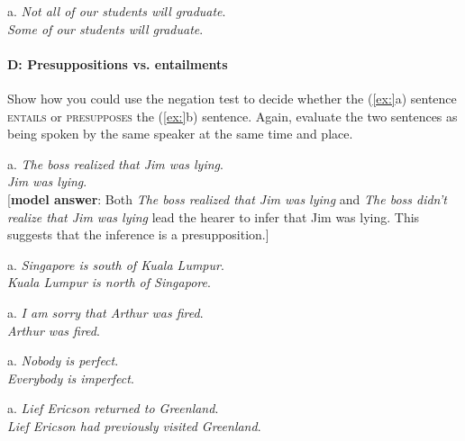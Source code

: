 \begin{stylepoints}
\ea%
    \label{ex:key:4}




          a. \textit{Not all of our students will graduate}.\\
\ex \textit{Some of our students will graduate}.
    \z
\end{stylepoints}

\paragraph*{D: Presuppositions vs. entailments}

Show how you could use the negation test to decide whether the (\ref{ex:}a) sentence \textsc{entails} or \textsc{presupposes} the (\ref{ex:}b) sentence. Again, evaluate the two sentences as being spoken by the same speaker at the same time and place.

\begin{stylepoints}
\ea%
    \label{ex:key:1}




          a. \textit{The boss realized that Jim was lying}.\\
\ex \textit{Jim was lying}.\\
{}[\textbf{model answer}: Both \textit{The boss realized that Jim was lying} and \textit{The boss didn’t realize that Jim was lying} lead the hearer to infer that Jim was lying. This suggests that the inference is a presupposition.]
    \z
\end{stylepoints}

\begin{stylepoints}
\ea%
    \label{ex:key:2}




          a. \textit{Singapore is south of Kuala Lumpur}.\\
\ex \textit{Kuala Lumpur is north of Singapore}.
    \z
\end{stylepoints}

\begin{stylepoints}
\ea%
    \label{ex:key:3}




          a. \textit{I am sorry that Arthur was fired}.\\
\ex \textit{Arthur was fired}.
    \z
\end{stylepoints}

\begin{stylepoints}
\ea%
    \label{ex:key:4}




          a. \textit{Nobody is perfect}.\\
\ex \textit{Everybody is imperfect}.
    \z
\end{stylepoints}

\begin{stylepoints}
\ea%
    \label{ex:key:5}




          a. \textit{Lief Ericson returned to Greenland}.\\
\ex \textit{Lief Ericson had previously visited Greenland}.
    \z
\end{stylepoints}

